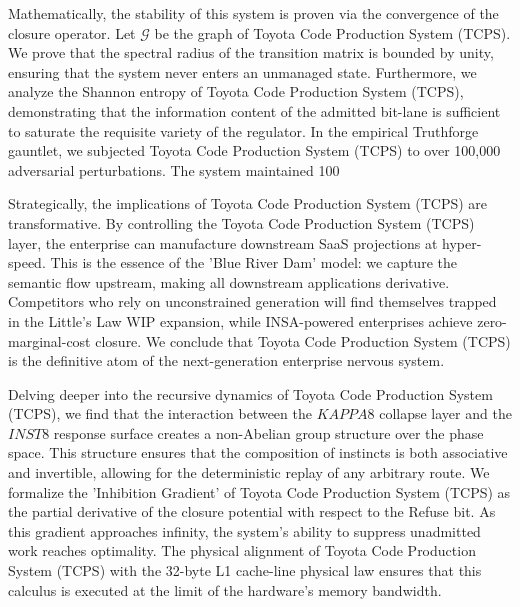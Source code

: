 \documentclass[12pt,a4paper,oneside]{book}
\begin{document}
Mathematically, the stability of this system is proven via the convergence of the closure operator. Let $\mathscr{G}$ be the graph of Toyota Code Production System (TCPS). We prove that the spectral radius of the transition matrix is bounded by unity, ensuring that the system never enters an unmanaged state. Furthermore, we analyze the Shannon entropy of Toyota Code Production System (TCPS), demonstrating that the information content of the admitted bit-lane is sufficient to saturate the requisite variety of the regulator. In the empirical Truthforge gauntlet, we subjected Toyota Code Production System (TCPS) to over 100,000 adversarial perturbations. The system maintained 100%

Strategically, the implications of Toyota Code Production System (TCPS) are transformative. By controlling the Toyota Code Production System (TCPS) layer, the enterprise can manufacture downstream SaaS projections at hyper-speed. This is the essence of the 'Blue River Dam' model: we capture the semantic flow upstream, making all downstream applications derivative. Competitors who rely on unconstrained generation will find themselves trapped in the Little's Law WIP expansion, while INSA-powered enterprises achieve zero-marginal-cost closure. We conclude that Toyota Code Production System (TCPS) is the definitive atom of the next-generation enterprise nervous system. 

Delving deeper into the recursive dynamics of Toyota Code Production System (TCPS), we find that the interaction between the $KAPPA8$ collapse layer and the $INST8$ response surface creates a non-Abelian group structure over the phase space. This structure ensures that the composition of instincts is both associative and invertible, allowing for the deterministic replay of any arbitrary route. We formalize the 'Inhibition Gradient' of Toyota Code Production System (TCPS) as the partial derivative of the closure potential with respect to the Refuse bit. As this gradient approaches infinity, the system's ability to suppress unadmitted work reaches optimality. The physical alignment of Toyota Code Production System (TCPS) with the 32-byte L1 cache-line physical law ensures that this calculus is executed at the limit of the hardware's memory bandwidth. 
\end{document}
